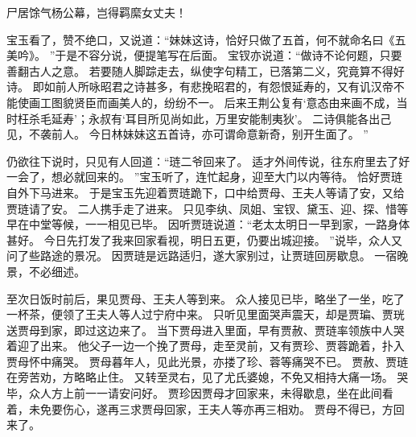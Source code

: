 \par
尸居馀气杨公幕，岂得羁縻女丈夫！\par
{}
\par
\hop
宝玉看了，赞不绝口，又说道：“妹妹这诗，恰好只做了五首，何不就命名曰《五美吟》。
”于是不容分说，便提笔写在后面。
宝钗亦说道：“做诗不论何题，只要善翻古人之意。
若要随人脚踪走去，纵使字句精工，已落第二义，究竟算不得好诗。
即如前人所咏昭君之诗甚多，有悲挽昭君的，有怨恨延寿的，又有讥汉帝不能使画工图貌贤臣而画美人的，纷纷不一。
后来王荆公复有‘意态由来画不成，当时枉杀毛延寿’；永叔有‘耳目所见尚如此，万里安能制夷狄’。
二诗俱能各出己见，不袭前人。
今日林妹妹这五首诗，亦可谓命意新奇，别开生面了。
”\par
仍欲往下说时，只见有人回道：“琏二爷回来了。
适才外间传说，往东府里去了好一会了，想必就回来的。
”宝玉听了，连忙起身，迎至大门以内等待。
恰好贾琏自外下马进来。
于是宝玉先迎着贾琏跪下，口中给贾母、王夫人等请了安，又给贾琏请了安。
二人携手走了进来。
只见李纨、凤姐、宝钗、黛玉、迎、探、惜等早在中堂等候，一一相见已毕。
因听贾琏说道：“老太太明日一早到家，一路身体甚好。
今日先打发了我来回家看视，明日五更，仍要出城迎接。
”说毕，众人又问了些路途的景况。
因贾琏是远路适归，遂大家别过，让贾琏回房歇息。
一宿晚景，不必细述。
\par
至次日饭时前后，果见贾母、王夫人等到来。
众人接见已毕，略坐了一坐，吃了一杯茶，便领了王夫人等人过宁府中来。
只听见里面哭声震天，却是贾㻞、贾珖送贾母到家，即过这边来了。
当下贾母进入里面，早有贾赦、贾琏率领族中人哭着迎了出来。
他父子一边一个挽了贾母，走至灵前，又有贾珍、贾蓉跪着，扑入贾母怀中痛哭。
贾母暮年人，见此光景，亦搂了珍、蓉等痛哭不已。
贾赦、贾琏在旁苦劝，方略略止住。
又转至灵右，见了尤氏婆媳，不免又相持大痛一场。
哭毕，众人方上前一一请安问好。
贾珍因贾母才回家来，未得歇息，坐在此间看着，未免要伤心，遂再三求贾母回家，王夫人等亦再三相劝。
贾母不得已，方回来了。
\par
